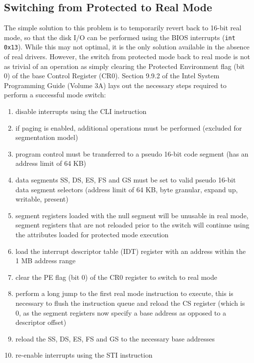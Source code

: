 \documentclass[titlepage]{article}
\begin{document}
\subsection{Switching from Protected to Real Mode}
The simple solution to this problem is to temporarily revert back to 16-bit real
mode, so that the disk I/O can be performed using the BIOS interrupts
(\verb!int 0x13!). While this may not optimal, it is the only solution available
in the absence of real drivers.  However, the switch from protected mode back to
real mode is not as trivial of an operation as simply clearing the Protected
Environment flag (bit 0) of the base Control Register (CR0). Section 9.9.2 of
the Intel System Programming Guide (Volume 3A) lays out the necessary steps
required to perform a successful mode switch:

\begin{enumerate}
    \item disable interrupts using the CLI instruction
    \item if paging is enabled, additional operations must be performed
    (excluded for segmentation model)
    \item program control must be transferred to a pseudo 16-bit code segment
    (has an address limit of 64 KB)
    \item data segments SS, DS, ES, FS and GS must be set to valid pseudo 16-bit
    data segment selectors (address limit of 64 KB, byte granular, expand up,
    writable, present)
    \item segment registers loaded with the null segment will be unusable in
    real mode, segment registers that are not reloaded prior to the switch will
    continue using the attributes loaded for protected mode execution
    \item load the interrupt descriptor table (IDT) register with an address
    within the 1 MB address range
    \item clear the PE flag (bit 0) of the CR0 register to switch to real mode
    \item perform a long jump to the first real mode instruction to execute,
    this is necessary to flush the instruction queue and reload the CS register
    (which is 0, as the segment registers now specify a base address as opposed
    to a descriptor offset)
    \item reload the SS, DS, ES, FS and GS to the necessary base addresses
    \item re-enable interrupts using the STI instruction
\end{enumerate}
\end{document}
